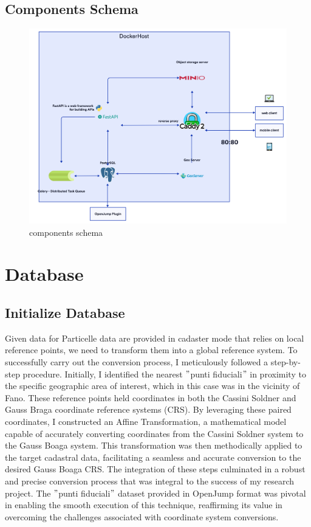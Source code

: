 \subsection{Components Schema}\label{subsec:components-schema}
\begin{figure}[H]
    \includegraphics[width=\textwidth]{res/components_schema}
    \caption{components schema}
    \label{fig:components-schema}
\end{figure}

\section{Database}\label{sec:database}
\subsection{Initialize Database}\label{subsec:database-implementation}
Given data for Particelle data are provided in cadaster mode that relies on local reference points, we need to transform them into a global reference system.
To successfully carry out the conversion process, I meticulously followed a step-by-step procedure.
Initially, I identified the nearest \("\)punti fiduciali\("\) in proximity to the specific geographic area of interest, which in this case was in the vicinity of Fano.
These reference points held coordinates in both the Cassini Soldner and Gauss Braga coordinate reference systems (CRS).
By leveraging these paired coordinates, I constructed an Affine Transformation, a mathematical model capable of accurately converting coordinates from the Cassini Soldner system to the Gauss Boaga system.
This transformation was then methodically applied to the target cadastral data, facilitating a seamless and accurate conversion to the desired Gauss Boaga CRS.
The integration of these steps culminated in a robust and precise conversion process that was integral to the success of my research project.
The \("\)punti fiduciali\("\) dataset provided in OpenJump format was pivotal in enabling the smooth execution of this technique, reaffirming its value in overcoming the challenges associated with coordinate system conversions.

